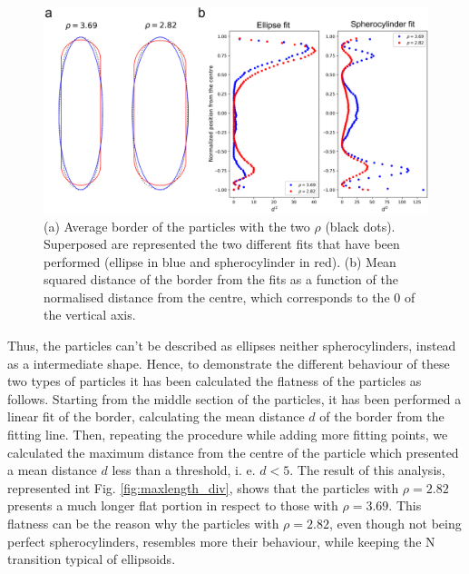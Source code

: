 \documentclass{article}
\begin{document}
\begin{figure}
    \centering
    \includegraphics[width=1\columnwidth]{Mean_bord.png}
    \caption{(a) Average border of the particles with the two $\rho$ (black dots). Superposed are represented the two different fits that have been performed (ellipse in blue and spherocylinder in red). (b) Mean squared distance of the border from the fits as a function of the normalised distance from the centre, which corresponds to the $0$ of the vertical axis.}
    \label{fig:Mean_bord}
\end{figure}

Thus, the particles can't be described as ellipses neither spherocylinders, instead as a intermediate shape. Hence, to demonstrate the different behaviour of these two types of particles it has been calculated the flatness of the particles as follows. Starting from the middle section of the particles, it has been performed a linear fit of the border, calculating the mean distance $d$ of the border from the fitting line. Then, repeating the procedure while adding more fitting points, we calculated the maximum distance from the centre of the particle which presented a mean distance $d$ less than a threshold, i. e. $d < 5$. The result of this analysis, represented int Fig. \ref{fig:maxlength_div}, shows that the particles with $\rho=2.82$ presents a much longer flat portion in respect to those with $\rho=3.69$. This flatness can be the reason why the particles with $\rho=2.82$, even though not being perfect spherocylinders, resembles more their behaviour, while keeping the N transition typical of ellipsoids. 
\end{document}
